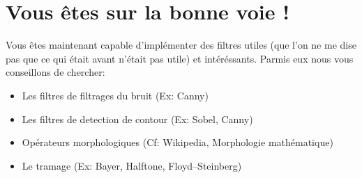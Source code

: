 \documentclass[a4paper]{article}
\begin{document}
\section{Vous êtes sur la bonne voie !}
Vous êtes maintenant capable d'implémenter des filtres utiles (que l'on ne me dise pas que ce qui était avant n'était pas utile) et intéréssants.
Parmis eux nous vous conseillons de chercher:
\begin{itemize}
\item Les filtres de filtrages du bruit (Ex: Canny)
\item Les filtres de detection de contour (Ex: Sobel, Canny)
\item Opérateurs morphologiques (Cf: Wikipedia, Morphologie mathématique)
\item Le tramage (Ex: Bayer, Halftone, Floyd–Steinberg)
\end{itemize}
\end{document}
